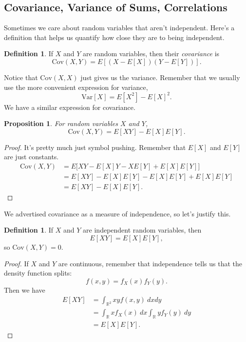 \documentclass[12pt]{article}
\theoremstyle{plain}
\newtheorem{proposition}[theorem]{Proposition}
\theoremstyle{definition}
\newtheorem{definition}[theorem]{Definition}
\theoremstyle{remark}
\newcommand{\Var}{\ensuremath{\textrm{Var}}}
\newcommand{\Cov}{\ensuremath{\textrm{Cov}}}
\newcommand{\R}{\mathbb{R}}
\begin{document}
\subsection{Covariance, Variance of Sums, Correlations}
Sometimes we care about random variables that aren't independent.
Here's a definition that helps us quantify how close they are to being independent.

\begin{definition}
    If $X$ and $Y$ are random variables, then their \emph{covariance} is
    \[
        \Cov(X,Y) = E[(X-E[X])(Y - E[Y])].
    \]
\end{definition}
Notice that $\Cov(X,X)$ just gives us the variance.
Remember that we usually use the more convenient expression for variance,
\[
    \Var[X] = E[X^2] - E[X]^2.
\]
We have a similar expression for covariance.
\begin{proposition}
    For random variables $X$ and $Y$,
    \[
        \Cov(X,Y) = E[XY]-E[X]E[Y].
    \]
\end{proposition}
\begin{proof}
    It's pretty much just symbol pushing.
    Remember that $E[X]$ and $E[Y]$ are just constants.
    \begin{align*}
        \Cov(X,Y) &= E\big[XY - E[X]Y - XE[Y] + E[X]E[Y]\big]\\
        &= E[XY]-E[X]E[Y]-E[X]E[Y] + E[X]E[Y]\\
        &= E[XY] - E[X]E[Y].
    \end{align*}
\end{proof}

We advertised covariance as a measure of independence, so let's justify this.
\begin{definition}
    If $X$ and $Y$ are independent random variables, then
    \[
        E[XY] = E[X]E[Y],
    \]
    so $\Cov(X,Y) = 0$.
\end{definition}
\begin{proof}
    If $X$ and $Y$ are continuous, remember that independence tells us that the density function splits:
    \[
        f(x,y) = f_X(x)f_Y(y).
    \]
    Then we have
    \begin{align*}
        E[XY] &= \int_{\R^2}xyf(x,y)\ dxdy\\
        &= \int_{\R}xf_X(x)\ dx\int_{\R}yf_Y(y)\ dy\\
        &= E[X]E[Y].
    \end{align*}
\end{proof}
\end{document}
